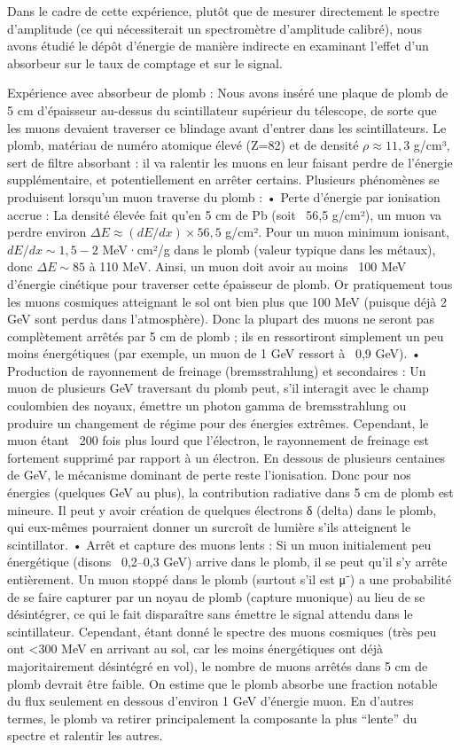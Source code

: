 \documentclass[a4paper,12pt,twoside]{article}
\begin{document}
Dans le cadre de cette expérience, plutôt que de mesurer directement le spectre d’amplitude (ce qui nécessiterait un spectromètre d’amplitude calibré), nous avons étudié le dépôt d’énergie de manière indirecte en examinant l’effet d’un absorbeur sur le taux de comptage et sur le signal.

Expérience avec absorbeur de plomb : Nous avons inséré une plaque de plomb de 5 cm d’épaisseur au-dessus du scintillateur supérieur du télescope, de sorte que les muons devaient traverser ce blindage avant d’entrer dans les scintillateurs. Le plomb, matériau de numéro atomique élevé (Z=82) et de densité $\rho \approx 11,3$ g/cm³, sert de filtre absorbant : il va ralentir les muons en leur faisant perdre de l’énergie supplémentaire, et potentiellement en arrêter certains. Plusieurs phénomènes se produisent lorsqu’un muon traverse du plomb :
	•	Perte d’énergie par ionisation accrue : La densité élevée fait qu’en 5 cm de Pb (soit ~56,5 g/cm²), un muon va perdre environ $\Delta E \approx (dE/dx) \times 56,5$ g/cm². Pour un muon minimum ionisant, $dE/dx \sim 1,5 - 2$ MeV·cm²/g dans le plomb (valeur typique dans les métaux), donc $\Delta E \sim 85$ à 110 MeV. Ainsi, un muon doit avoir au moins ~100 MeV d’énergie cinétique pour traverser cette épaisseur de plomb. Or pratiquement tous les muons cosmiques atteignant le sol ont bien plus que 100 MeV (puisque déjà 2 GeV sont perdus dans l’atmosphère). Donc la plupart des muons ne seront pas complètement arrêtés par 5 cm de plomb ; ils en ressortiront simplement un peu moins énergétiques (par exemple, un muon de 1 GeV ressort à ~0,9 GeV).
	•	Production de rayonnement de freinage (bremsstrahlung) et secondaires : Un muon de plusieurs GeV traversant du plomb peut, s’il interagit avec le champ coulombien des noyaux, émettre un photon gamma de bremsstrahlung ou produire un changement de régime pour des énergies extrêmes. Cependant, le muon étant ~200 fois plus lourd que l’électron, le rayonnement de freinage est fortement supprimé par rapport à un électron. En dessous de plusieurs centaines de GeV, le mécanisme dominant de perte reste l’ionisation. Donc pour nos énergies (quelques GeV au plus), la contribution radiative dans 5 cm de plomb est mineure. Il peut y avoir création de quelques électrons δ (delta) dans le plomb, qui eux-mêmes pourraient donner un surcroît de lumière s’ils atteignent le scintillator.
	•	Arrêt et capture des muons lents : Si un muon initialement peu énergétique (disons ~0,2–0,3 GeV) arrive dans le plomb, il se peut qu’il s’y arrête entièrement. Un muon stoppé dans le plomb (surtout s’il est μ⁻) a une probabilité de se faire capturer par un noyau de plomb (capture muonique) au lieu de se désintégrer, ce qui le fait disparaître sans émettre le signal attendu dans le scintillateur. Cependant, étant donné le spectre des muons cosmiques (très peu ont <300 MeV en arrivant au sol, car les moins énergétiques ont déjà majoritairement désintégré en vol), le nombre de muons arrêtés dans 5 cm de plomb devrait être faible. On estime que le plomb absorbe une fraction notable du flux seulement en dessous d’environ 1 GeV d’énergie muon. En d’autres termes, le plomb va retirer principalement la composante la plus “lente” du spectre et ralentir les autres.
\end{document}
